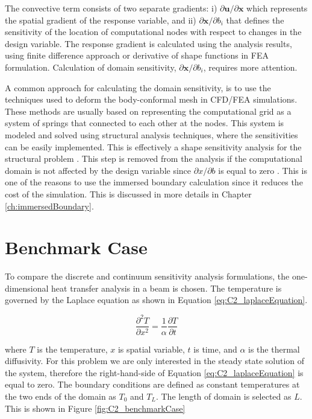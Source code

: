 The convective term consists of two separate gradients: i) $\partial \mathbf{u} / \partial \mathbf{x}$ which represents the spatial gradient of the response variable, and ii) $\partial \mathbf{x} / \partial b_i$ that defines the sensitivity of the location of computational nodes with respect to changes in the design variable. The response gradient is calculated using the analysis results, using finite difference approach or derivative of shape functions in FEA formulation. Calculation of domain sensitivity, $\partial \mathbf{x} / \partial b_i$, requires more attention.

A common approach for calculating the domain sensitivity, is to use the techniques used to deform the body-conformal mesh in CFD/FEA simulations. These methods are usually based on representing the computational grid as a system of springs that connected to each other at the nodes. This system is modeled and solved using structural analysis techniques, where the sensitivities can be easily implemented. This is effectively a shape sensitivity analysis for the structural problem \cite{haftka1986structural}. This step is removed from the analysis if the computational domain is not affected by the design variable since $\partial x/\partial b$ is equal to zero \cite{gobal2014continuum}. This is one of the reasons to use the immersed boundary calculation since it reduces the cost of the simulation. This is discussed in more details in Chapter \ref{ch:immersedBoundary}.

\section{Benchmark Case}
To compare the discrete and continuum sensitivity analysis formulations, the one-dimensional heat transfer analysis in a beam is chosen. The temperature is governed by the Laplace equation as shown in Equation \eqref{eq:C2_laplaceEquation}.

\begin{equation}\label{eq:C2_laplaceEquation}
	\frac{\partial^2 T}{\partial x^2} = \frac{1}{\alpha} \frac{\partial T}{\partial t}
\end{equation}

where $T$ is the temperature, $x$ is spatial variable, $t$ is time, and $\alpha$ is the thermal diffusivity. For this problem we are only interested in the steady state solution of the system, therefore the right-hand-side of Equation \eqref{eq:C2_laplaceEquation} is equal to zero. The boundary conditions are defined as constant temperatures at the two ends of the domain as $T_0$ and $T_L$. The length of domain is selected as $L$. This is shown in Figure \ref{fig:C2_benchmarkCase}

